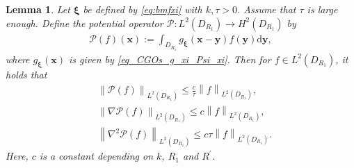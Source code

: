 \documentclass[11pt,reqno,oneside]{amsart}
\newtheorem{lemma}{Lemma}[section]
\theoremstyle{definition}
\theoremstyle{remark}
\numberwithin{equation}{section}
\numberwithin{equation}{section}
\theoremstyle{remark}
\begin{document}
\begin{lemma} \label{lem_CGOs_fundamental_solution_and_integral_estimation_gphi}
	Let $ \bm{\xi}$ be defined by \eqref{eq:bmfxi} with $ k,\tau > 0 $. Assume that $ \tau $ is large enough. 
	Define the potential operator $ \mathcal{P} : L^2\left(D_{R_1}\right)\to H^2\left(D_{R_1}\right) $ by
	\begin{align} \label{def_CGOs_operator_P}
		\mathcal{P}\left(f\right)\left(\mathbf{x}\right) := \int_{D_{R_1}} g_{\bm{\xi}} \left(\mathbf{x} - \mathbf{y}\right) f \left(\mathbf{y}\right) \mathrm{d} \mathbf{y},
	\end{align}
	where $ g_{\bm{\xi}}\left(\mathbf{x}\right) $ is given by \eqref{eq_CGOs_g_xi_Psi_xi}. Then for $ f \in L^2\left(D_{R_1}\right) $, it holds that
	\begin{align} 
		\label{est_CGOs_integral_gf_L^2}
		&\left\| \mathcal{P}\left(f\right)  \right\|_{L^2\left(D_{R_1}\right)} \leqslant \frac{c}{\tau} \left\| f \right\|_{L^2\left(D_{R_1}\right)}, \\
		\label{est_CGOs_gradient_integral_gf_L^2}
		&\left\| \nabla \mathcal{P}\left(f\right) \right\|_{L^2\left(D_{R_1}\right)} \leqslant c \left\| f \right\|_{L^2\left(D_{R_1}\right)}, \\
		\label{est_CGOs_gradient_gradient_integral_gf_L^2}
		&\left\| \nabla^2 \mathcal{P}\left(f\right) \right\|_{L^2\left(D_{R_1}\right)} \leqslant c \tau \left\| f \right\|_{L^2\left(D_{R_1}\right)} .
	\end{align}
	Here, $ c $ is a constant depending on $ k $, $ R_1 $ and  $ R^{\prime} $.
\end{lemma}
\end{document}
